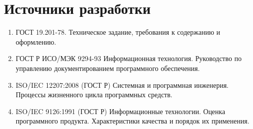 \documentclass[a4paper,14pt]{extreport}
\begin{document}
	\section{Источники разработки}
	\begin{enumerate}


		\item ГОСТ 19.201-78. Техническое задание, требования к содержанию и оформлению.
		\item ГОСТ Р ИСО/МЭК 9294-93 Информационная технология. Руководство по управлению документированием программного обеспечения.
		\item ISO/IEC 12207:2008 (ГОСТ Р) Системная и программная инженерия. Процессы жизненного цикла программных средств.
		\item ISO/IEC 9126:1991 (ГОСТ Р) Информационные технологии. Оценка программного продукта. Характеристики качества и порядок их применения.
	\end{enumerate}
	
\end{document}
